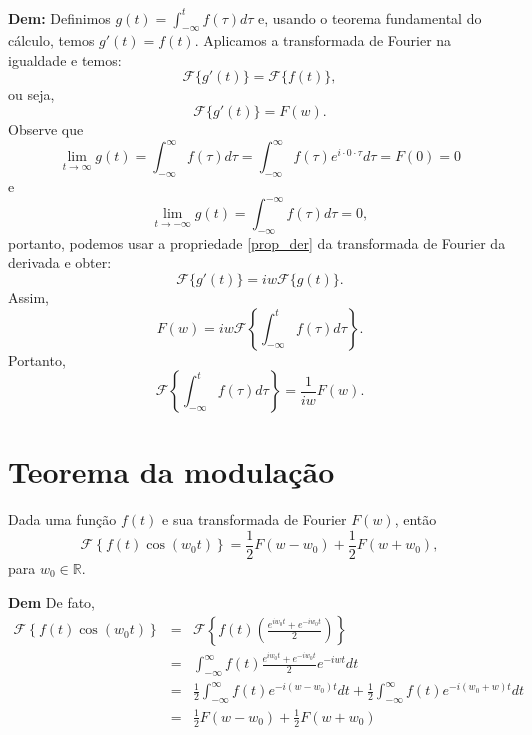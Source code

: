 \documentclass[a4paper,10pt]{book}
\begin{document}
{\bf Dem:}
 Definimos $g(t)=\int_{-\infty}^t f(\tau)d\tau$ e, usando o teorema fundamental do cálculo, temos $g'(t)=f(t)$. Aplicamos a transformada de Fourier na igualdade e temos:
 \begin{equation}
 \mathcal{F}\{g'(t)\}=\mathcal{F}\{f(t)\},
 \end{equation}
 ou seja,
 \begin{equation}
 \mathcal{F}\{g'(t)\}=F(w).
 \end{equation}
 Observe que
 \begin{equation}
 \lim_{t\to\infty} g(t)=\int_{-\infty}^\infty f(\tau)d\tau=\int_{-\infty}^\infty f(\tau)e^{i\cdot 0 \cdot \tau}d\tau=F(0)=0
 \end{equation}
 e
 \begin{equation}
 \lim_{t\to-\infty} g(t)=\int_{-\infty}^{-\infty} f(\tau)d\tau=0,
 \end{equation}
 portanto, podemos usar a propriedade \ref{prop_der} da transformada de Fourier da derivada e obter:
 \begin{equation}
 \mathcal{F}\{g'(t)\}=iw \mathcal{F}\{g(t)\}.
 \end{equation}
 Assim,
 \begin{equation}
 F(w)=iw \mathcal{F}\left\{\int_{-\infty}^t f(\tau)d\tau\right\}.
 \end{equation}
 Portanto,
 \begin{equation}
 \mathcal{F}\left\{\int_{-\infty}^t f(\tau)d\tau\right\}=\frac{1}{iw}F(w).
 \end{equation}

\section{Teorema da modulação}\label{prop_mod}
Dada uma função $f(t)$ e sua transformada de Fourier $F(w)$, então
 \begin{equation}
 \mathcal{F}\left\{f(t)\cos(w_0t) \right\}=\frac{1}{2}F(w-w_0)+\frac{1}{2}F(w+w_0),
 \end{equation}
 para $w_0\in\mathbb{R}$.

{\bf Dem}
 De fato,
 \begin{eqnarray*}
 \mathcal{F}\left\{f(t)\cos(w_0t) \right\}&=&\mathcal{F}\left\{f(t)\left(\frac{e^{iw_0t}+e^{-iw_0t}}{2} \right)\right\} \\
 &=&\int_{-\infty}^\infty f(t)\frac{e^{iw_0t}+e^{-iw_0t}}{2}e^{-iwt}dt  \\
 &=&\frac{1}{2}\int_{-\infty}^\infty f(t)e^{-i(w-w_0)t}dt+\frac{1}{2}  \int_{-\infty}^\infty f(t)e^{-i(w_0+w)t}dt\\
 &=&\frac{1}{2}F(w-w_0)+\frac{1}{2}F(w+w_0)
 \end{eqnarray*}
\end{document}

